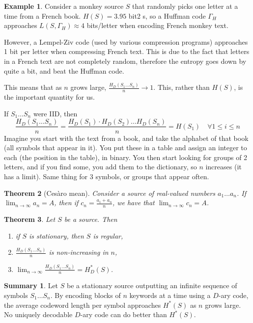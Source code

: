 \documentclass{report}
\theoremstyle{plain}
\newtheorem{thm}{Theorem}
\theoremstyle{definition}
\newtheorem{exmp}[thm]{Example}
\newtheorem*{summary}{Summary}
\theoremstyle{remark}
\begin{document}
\begin{exmp}
	Consider a monkey source $S$ that randomly picks one letter at a time from a French book. $H(S) = 3.95$ bit2	s, so a Huffman code $\Gamma_H$ approaches $L(S, \Gamma_H) \approx 4$ bits/letter when encoding French monkey text. \par 
	However, a Lempel-Ziv code (used by various compression programs) approaches 1 bit per letter when compressing French text. This is due to the fact that letters in a French text are not completely random, therefore the entropy goes down by quite a bit, and beat the Huffman code. \par
	This means that as $n$ grows large, $\frac{H_D(S_1 \ldots S_n)}{n} \to 1$. This, rather than $H(S)$, is the important quantity for us. \par
	If $S_1 \ldots S_n$ were IID, then
	\begin{equation*}
		\frac{H_D(S_1 \ldots S_n)}{n} = \frac{H_D(S_1) \cdot H_D(S_2) \ldots H_D(S_n)}{n} = H(S_1) \quad \forall 1 \leq i \leq n
	\end{equation*}
	Imagine you start with the text from a book, and take the alphabet of that book (all symbols that appear in it). You put these in a table and assign an integer to each (the position in the table), in binary. You then start looking for groups of 2 letters, and if you find some, you add them to the dictionary, so $n$ increases (it has a limit). Same thing for 3 symbols, or groups that appear often. 
\end{exmp}

\begin{thm}[Cesàro mean]
	Consider a source of real-valued numbers $a_1 \ldots a_n$. If $\lim_{n \to \infty} a_n = A$, then if $c_n = \frac{a_1 + a_n}{n}$, we have that $\lim_{n \to \infty} c_n = A$.
\end{thm}

\begin{thm} Let $S$ be a source. Then
	\begin{enumerate}
		\item if $S$ is stationary, then $S$ is regular,
		\item $\frac{H_D(S_1 \ldots S_n)}{n}$ is non-increasing in $n$,
		\item $\lim_{n \to \infty} \frac{H_D(S_1 \ldots S_n)}{n} = H_D^*(S)$.
	\end{enumerate}
\end{thm}

\begin{summary}
	Let $S$ be a stationary source outputting an infinite sequence of symbols $S_1 \ldots S_n$. By encoding blocks of $n$ keywords at a time using a $D$-ary code, the average codeword length per symbol approaches $H^*(S)$ as $n$ grows large. No uniquely decodable $D$-ary code can do better than $H^*(S)$.
\end{summary}
\end{document}
